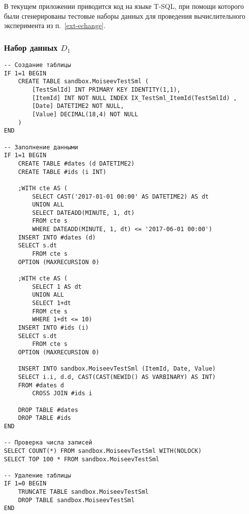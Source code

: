 
В текущем приложении приводится код на языке T-SQL, при помощи которого были сгенерированы тестовые наборы данных для проведения вычислительного эксперимента из п.~\ref{ext-echange}.

\subsubsection*{Набор данных $D_1$}
\begin{lstlisting}
-- Создание таблицы
IF 1=1 BEGIN
	CREATE TABLE sandbox.MoiseevTestSml (
		[TestSmlId] INT PRIMARY KEY IDENTITY(1,1),
		[ItemId] INT NOT NULL INDEX IX_TestSml_ItemId(TestSmlId) ,
		[Date] DATETIME2 NOT NULL,
		[Value] DECIMAL(18,4) NOT NULL
	)
END

-- Заполнение данными
IF 1=1 BEGIN
	CREATE TABLE #dates (d DATETIME2)
	CREATE TABLE #ids (i INT)

	;WITH cte AS (
		SELECT CAST('2017-01-01 00:00' AS DATETIME2) AS dt
		UNION ALL
		SELECT DATEADD(MINUTE, 1, dt)
		FROM cte s
		WHERE DATEADD(MINUTE, 1, dt) <= '2017-06-01 00:00')
	INSERT INTO #dates (d)
	SELECT s.dt
		FROM cte s
	OPTION (MAXRECURSION 0)

	;WITH cte AS (
		SELECT 1 AS dt
		UNION ALL
		SELECT 1+dt
		FROM cte s
		WHERE 1+dt <= 10)
	INSERT INTO #ids (i)
	SELECT s.dt
		FROM cte s
	OPTION (MAXRECURSION 0)

	INSERT INTO sandbox.MoiseevTestSml (ItemId, Date, Value)
	SELECT i.i, d.d, CAST(CAST(NEWID() AS VARBINARY) AS INT)
	FROM #dates d
		CROSS JOIN #ids i

	DROP TABLE #dates
	DROP TABLE #ids
END

-- Проверка числа записей
SELECT COUNT(*) FROM sandbox.MoiseevTestSml WITH(NOLOCK)
SELECT TOP 100 * FROM sandbox.MoiseevTestSml

-- Удаление таблицы
IF 1=0 BEGIN
	TRUNCATE TABLE sandbox.MoiseevTestSml
	DROP TABLE sandbox.MoiseevTestSml
END
\end{lstlisting}

